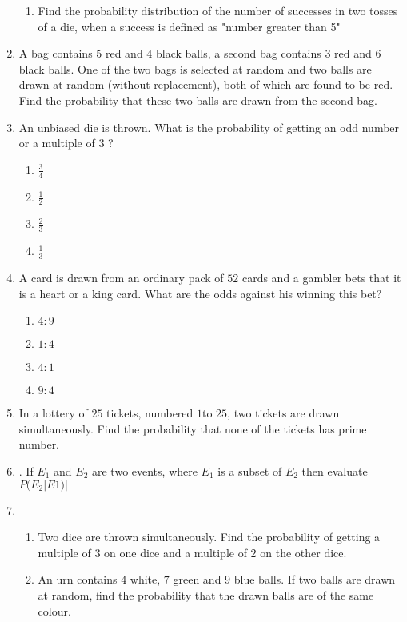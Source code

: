 \documentclass{article}
\begin{document}
\begin{enumerate}
\begin{enumerate}
			\item Find the probability distribution of the number of successes in two tosses of a die, when a success is defined as "number greater than 5"
				\end{enumerate}
			\item A bag contains $5$ red and $4$ black balls, a second bag contains $3$ red and $6$ black balls. One of the two bags is selected at random and two balls are drawn at random (without replacement), both of which are found to be red. Find the probability that these two balls are drawn from the second bag.
		\item An unbiased die is thrown. What is the probability of getting an odd number or a multiple of $3$ ?
		\begin{enumerate}%
			\item $\frac{3}{4}$
				\item $\frac{1}{2}$
                		\item $\frac{2}{3}$
                		\item $\frac{1}{3}$
                        \end{enumerate}
		\item A card is drawn from an ordinary pack of $52$ cards and a gambler bets that it is a heart or a king card. What are the odds against his winning this bet?
			\begin{enumerate}%
				\item $4:9$
				\item $1:4$
				\item $4:1$
				\item $9:4$
			\end{enumerate}
		\item In a lottery of $25$ tickets, numbered $1 $to $25$, two tickets are drawn simultaneously. Find the probability that none of the tickets has prime number.
		\item . If {$E_{1}$} and {$E_{2}$} are two events, where {$E_{1}$} is a subset of {$E_{2}$} then evaluate {$P( E_{2} |E 1 )|$}
		\item \begin{enumerate}%
				\item Two dice are thrown simultaneously. Find the probability of getting a multiple of $3$ on one dice and a multiple of $2$ on the other dice.
				\item An urn contains $4$ white, $7$ green and $9$ blue balls. If two balls are drawn at random, find the probability that the drawn balls are of the same colour.
		\end{enumerate}

\end{enumerate}
\end{document}

